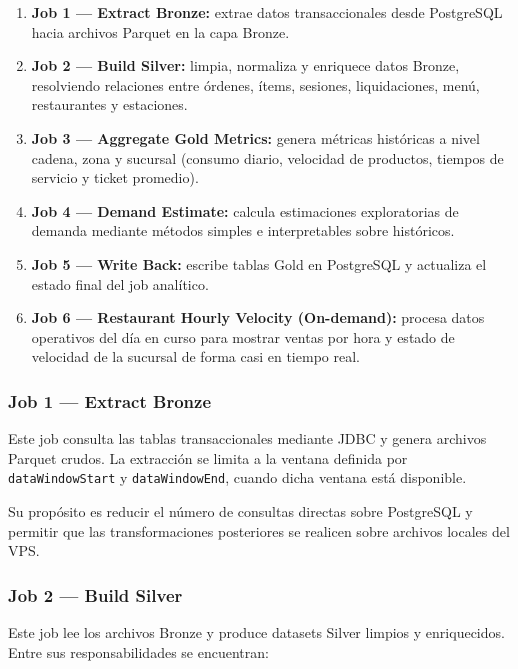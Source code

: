 \begin{enumerate}[leftmargin=1.5em]
  \item \textbf{Job 1 --- Extract Bronze:} extrae datos transaccionales desde PostgreSQL
  hacia archivos Parquet en la capa Bronze.

  \item \textbf{Job 2 --- Build Silver:} limpia, normaliza y enriquece datos Bronze,
  resolviendo relaciones entre órdenes, ítems, sesiones, liquidaciones, menú, restaurantes
  y estaciones.

  \item \textbf{Job 3 --- Aggregate Gold Metrics:} genera métricas históricas a nivel cadena,
  zona y sucursal (consumo diario, velocidad de productos, tiempos de servicio y ticket promedio).

  \item \textbf{Job 4 --- Demand Estimate:} calcula estimaciones exploratorias de demanda
  mediante métodos simples e interpretables sobre históricos.

  \item \textbf{Job 5 --- Write Back:} escribe tablas Gold en PostgreSQL y actualiza el
  estado final del job analítico.

  \item \textbf{Job 6 --- Restaurant Hourly Velocity (On-demand):} procesa datos operativos
  del día en curso para mostrar ventas por hora y estado de velocidad de la sucursal de forma casi en tiempo real.
\end{enumerate}

\subsubsection{Job 1 --- Extract Bronze}

Este job consulta las tablas transaccionales mediante JDBC y genera archivos Parquet
crudos. La extracción se limita a la ventana definida por \texttt{dataWindowStart} y
\texttt{dataWindowEnd}, cuando dicha ventana está disponible.

Su propósito es reducir el número de consultas directas sobre PostgreSQL y permitir que
las transformaciones posteriores se realicen sobre archivos locales del VPS.

\subsubsection{Job 2 --- Build Silver}

Este job lee los archivos Bronze y produce datasets Silver limpios y enriquecidos. Entre
sus responsabilidades se encuentran:

